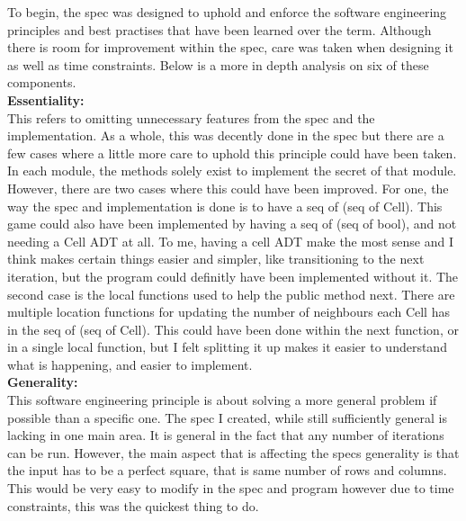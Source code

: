 \documentclass[12pt]{article}
\begin{document}
To begin, the spec was designed to uphold and enforce the software engineering principles and best practises that have been learned over the term. Although there is room for improvement within the spec, care was taken when designing it as well as time constraints. Below is a more in depth analysis on six of these components.\\

\noindent
\textbf{Essentiality:} \\
This refers to omitting unnecessary features from the spec and the implementation. As a whole, this was decently done in the spec but there are a few cases where a little more care to uphold this principle could have been taken. In each module, the methods solely exist to implement the secret of that module. However, there are two cases where this could have been improved. For one, the way the spec and implementation is done is to have a seq of (seq of Cell). This game could also have been implemented by having a seq of (seq of bool), and not needing a Cell ADT at all. To me, having a cell ADT make the most sense and I think makes certain things easier and simpler, like transitioning to the next iteration, but the program could definitly have been implemented without it. The second case is the local functions used to help the public method next. There are multiple location functions for updating the number of neighbours each Cell has in the seq of (seq of Cell). This could have been done within the next function, or in a single local function, but I felt splitting it up makes it easier to understand what is happening, and easier to implement.\\

\noindent
\textbf{Generality:} \\
This software engineering principle is about solving a more general problem if possible than a specific one. The spec I created, while still sufficiently general is lacking in one main area. It is general in the fact that any number of iterations can be run. However, the main aspect that is affecting the specs generality is that the input has to be a perfect square, that is same number of rows and columns. This would be very easy to modify in the spec and program however due to time constraints, this was the quickest thing to do.\\
\end{document}
